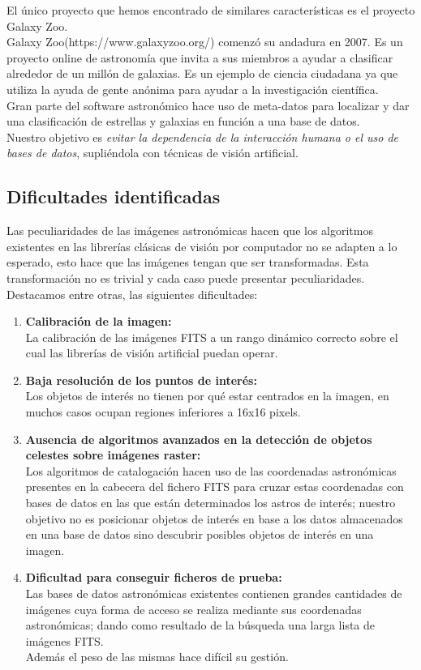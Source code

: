 	El único proyecto que hemos encontrado de similares características	es el proyecto Galaxy Zoo. \\
	Galaxy Zoo(https://www.galaxyzoo.org/) comenzó su andadura en 2007. Es un proyecto online de astronomía que invita a sus miembros a ayudar a clasificar alrededor de un millón de galaxias. Es un ejemplo de ciencia ciudadana ya que utiliza la ayuda de gente anónima para ayudar a la investigación científica. \\
	Gran parte del software astronómico hace uso de meta-datos para localizar y dar una clasificación de estrellas y galaxias en función a una base de datos. \\
	Nuestro objetivo es \textit{evitar la dependencia de la interacción humana o el uso de bases de datos}, supliéndola con técnicas de visión artificial.\\

	\subsection{Dificultades identificadas}
	Las peculiaridades de las imágenes astronómicas hacen que los algoritmos existentes en las librerías clásicas de visión por computador no se adapten a lo esperado, esto hace que las imágenes tengan que ser transformadas. Esta transformación no es trivial y cada caso puede presentar peculiaridades.
	\newline
	\\
	Destacamos entre otras, las siguientes dificultades:
	\begin{enumerate}
	\item \textbf{Calibración de la imagen:}\\
	La calibración de las imágenes FITS a un rango dinámico correcto sobre el cual las librerías de visión artificial puedan operar.
	\item \textbf{Baja resolución de los puntos de interés:}\\
	Los objetos de interés no tienen por qué estar centrados en la imagen, en muchos casos ocupan regiones inferiores a 16x16 pixels. 
	\item \textbf{Ausencia de algoritmos avanzados en la detección de objetos celestes sobre imágenes raster:}\\
	Los algoritmos de catalogación hacen uso de las coordenadas astronómicas presentes en la cabecera del fichero FITS para cruzar estas coordenadas con bases de datos en las que están determinados los astros de interés; nuestro objetivo no es posicionar objetos de interés en base a los datos almacenados en una base de datos sino descubrir posibles objetos de interés en una imagen.
	\item \textbf{Dificultad para conseguir ficheros de prueba:} \\
	Las bases de datos astronómicas existentes contienen grandes cantidades de imágenes cuya forma de acceso se realiza mediante sus coordenadas astronómicas; dando como resultado de la búsqueda una larga lista de imágenes FITS.\\Además el peso de las mismas hace difícil su gestión.
	\end{enumerate}
	\newpage

